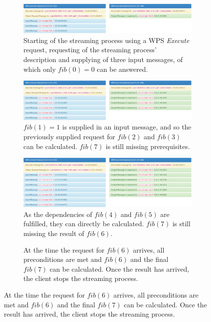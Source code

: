     \begin{figure}
      \def\fibfigsize{.93\linewidth}
      \centering
      \begin{subfigure}{\fibfigsize}
        \caption{Starting of the streaming process using a WPS \emph{Execute} request, requesting of the streaming process' description and supplying of three input messages, of which only $fib(0) = 0$ can be answered.}
        \includegraphics[width=\linewidth]{figures/fibonacci-1.png}
      \end{subfigure}
      \begin{subfigure}{\fibfigsize}
        \caption{$fib(1) = 1$ is supplied in an input message, and so the previously supplied request for $fib(2)$ and $fib(3)$ can be calculated. $fib(7)$ is still missing prerequisites.}
        \includegraphics[width=\linewidth]{figures/fibonacci-2.png}
      \end{subfigure}
      \begin{subfigure}{\fibfigsize}
        \caption{As the dependencies of $fib(4)$ and $fib(5)$ are fulfilled, they can directly be calculated. $fib(7)$ is still missing the result of $fib(6)$.}
        \includegraphics[width=\linewidth]{figures/fibonacci-3.png}
      \end{subfigure}
      \begin{subfigure}{\fibfigsize}
        \caption{At the time the request for $fib(6)$ arrives, all preconditions are met and $fib(6)$ and the final $fib(7)$ can be calculated. Once the result has arrived, the client stops the streaming process.}

\end{subfigure}
\end{figure}
